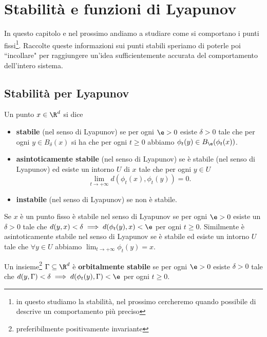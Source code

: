 \chapter{Stabilit\`a e funzioni di Lyapunov}
In questo capitolo e nel prossimo andiamo a studiare come si comportano i punti fissi\footnote{in questo studiamo la stabilit\`a, nel prossimo cercheremo quando possibile di descrive un comportamento pi\`u preciso}. Raccolte queste informazioni sui punti stabili speriamo di poterle poi ``incollare" per raggiungere un'idea sufficientemente accurata del comportamento dell'intero sistema.

\section{Stabilit\`a per Lyapunov}
\begin{definition}
Un punto $x\in\R^d$ si dice 
\setlength{\leftmargini}{0.3cm}
\begin{itemize}
\item \textbf{stabile} (nel senso di Lyapunov) se per ogni $\e>0$ esiste $\delta>0$ tale che per ogni $y\in B_\delta(x)$ si ha che per ogni $t\geq 0$ abbiamo $\phi_t(y)\in B_\e(\phi_t(x))$.
\item \textbf{asintoticamente stabile} (nel senso di Lyapunov) se \`e stabile (nel senso di Lyapunov) ed esiste un intorno $U$ di $x$ tale che per ogni $y\in U$
\[\lim_{t\to+\infty}d(\phi_t(x),\phi_t(y))=0.\]
\item \textbf{instabile} (nel senso di Lyapunov) se non \`e stabile.
\end{itemize}
\setlength{\leftmargini}{0.5cm}
\end{definition}

\begin{remark}
Se $x$ \`e un punto fisso \`e stabile nel senso di Lyapunov se per ogni $\e>0$ esiste un $\delta>0$ tale che $d(y,x)<\delta\implies d(\phi_t(y),x)<\e$ per ogni $t\geq 0$. Similmente \`e asintoticamente stabile nel senso di Lyapunov se \`e stabile ed esiste un intorno $U$ tale che $\forall y\in U$ abbiamo $\displaystyle\lim_{t\to+\infty}\phi_t(y)= x$.
\end{remark}

\begin{definition}
Un insieme\footnote{preferibilmente positivamente invariante} $\Gamma\subseteq \R^d$ \`e \textbf{orbitalmente stabile} se per ogni $\e>0$ esiste $\delta>0$ tale che $d(y,\Gamma)<\delta\implies d(\phi_t(y),\Gamma)<\e$ per ogni $t\geq 0$.
\end{definition}

